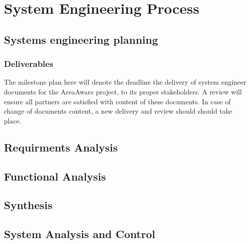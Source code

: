 %
\thispagestyle{fancy}
\chapter{System Engineering Process}
\label{chp:se_process}

\section{Systems engineering planning}

\subsection{Deliverables}
\label{plan:deliverables}
The milestone plan here will denote the deadline the delivery of system engineer documents for the AreaAware project, to its proper stakeholders.
A review will ensure all partners are satisfied with content of these documents.
In case of change of documents content, a new delivery and review should should take place.



\section{Requirments Analysis}



\section{Functional Analysis}



\section{Synthesis}



\section {System Analysis and Control}
